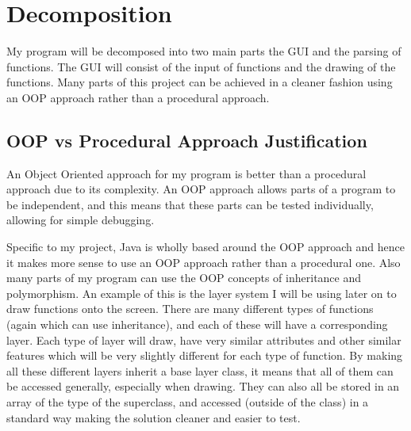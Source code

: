 \documentclass[../../../../main.tex]{subfiles}
\begin{document}
\section{Decomposition}
My program will be decomposed into two main parts the GUI and the parsing of functions. The GUI will consist of the input of functions and the drawing of the functions. Many parts of this project can be achieved in a cleaner fashion using an OOP approach rather than a procedural approach.
\subsection{OOP vs Procedural Approach Justification}
An Object Oriented approach for my program is better than a procedural approach due to its complexity. An OOP approach allows parts of a program to be independent, and this means that these parts can be tested individually, allowing for simple debugging. 

Specific to my project, Java is wholly based around the OOP approach and hence it makes more sense to use an OOP approach rather than a procedural one. Also many parts of my program can use the OOP concepts of inheritance and polymorphism. An example of this is the layer system I will be using later on to draw functions onto the screen. There are many different types of functions (again which can use inheritance), and each of these will have a corresponding layer. Each type of layer will draw, have very similar attributes and other similar features which will be very slightly different for each type of function. By making all these different layers inherit a base layer class, it means that all of them can be accessed generally, especially when drawing. They can also all be stored in an array of the type of the superclass, and accessed (outside of the class) in a standard way making the solution cleaner and easier to test.
\newpage
\end{document}

